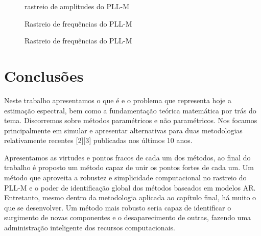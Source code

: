 \begin{figure}[H]
	\centering    
	\def\svgwidth{\columnwidth}
	
	\caption{rastreio de amplitudes do PLL-M}
	\label{fig:rastreio_final}
\end{figure}

\begin{figure}[H]
	\centering    
	\def\svgwidth{\columnwidth}
	
	\caption{Rastreio de frequências do PLL-M}
	\label{fig:amplitudes}
\end{figure}
\begin{figure}[H]
	\centering    
	\def\svgwidth{\columnwidth}
	
	\caption{Rastreio de frequências do PLL-M}
	\label{fig:amplitudes}
\end{figure}


\section{Conclusões}

Neste trabalho apresentamos o que é e o problema que representa hoje a estimação espectral, bem como a fundamentação teórica matemática por trás do tema. Discorremos sobre métodos paramétricos e não paramétricos. Nos focamos principalmente em simular e apresentar alternativas para duas metodologias relativamente recentes [2][3] publicadas nos últimos 10 anos. 

Apresentamos as virtudes e pontos fracos de cada um dos métodos, ao final do trabalho é proposto um método capaz de unir os pontos fortes de cada um. Um método que aproveita a robustez e simplicidade computacional no rastreio do PLL-M e o poder de identificação global dos métodos baseados em modelos AR. Entretanto, mesmo dentro da metodologia aplicada ao capítulo final, há muito o que se desenvolver. Um método mais robusto seria capaz de identificar o surgimento de novas componentes e o desaparecimento de outras, fazendo uma administração inteligente dos recursos computacionais. 
